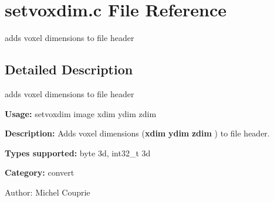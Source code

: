 \section{setvoxdim.c File Reference}
\label{setvoxdim_8c}
adds voxel dimensions to file header  




\label{_details}
\subsection{Detailed Description}
adds voxel dimensions to file header 

{\bf Usage:} setvoxdim image xdim ydim zdim

{\bf Description:} Adds voxel dimensions ({\bf xdim} {\bf ydim} {\bf zdim} ) to file header.

{\bf Types supported:} byte 3d, int32\_\-t 3d

{\bf Category:} convert

\begin{Desc}
\item[Author:]Michel Couprie \end{Desc}
